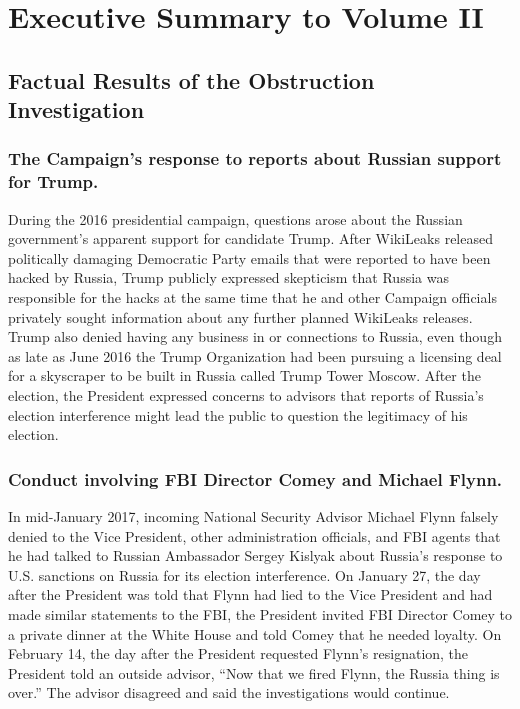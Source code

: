 \section*{Executive Summary to Volume II}
\label{sec:executive}

\subsection*{Factual Results of the Obstruction Investigation}

\subsubsection*{The Campaign’s response to reports about Russian support for Trump.}

During the 2016 presidential campaign, questions arose about the Russian government’s apparent support for candidate Trump.
After WikiLeaks released politically damaging Democratic Party emails that were reported to have been hacked by Russia, Trump publicly expressed skepticism that Russia was responsible for the hacks at the same time that he and other Campaign officials privately sought information about any further planned WikiLeaks releases.
Trump also denied having any business in or connections to Russia, even though as late as June 2016 the Trump Organization had been pursuing a licensing deal for a skyscraper to be built in Russia called Trump Tower Moscow.
After the election, the President expressed concerns to advisors that reports of Russia’s election interference might lead the public to question the legitimacy of his election.

\subsubsection*{Conduct involving FBI Director Comey and Michael Flynn.}

In mid-January 2017, incoming National Security Advisor Michael Flynn falsely denied to the Vice President, other administration officials, and FBI agents that he had talked to Russian Ambassador Sergey Kislyak about Russia’s response to U.S. sanctions on Russia for its election interference.
On January 27, the day after the President was told that Flynn had lied to the Vice President and had made similar statements to the FBI, the President invited FBI Director Comey to a private dinner at the White House and told Comey that he needed loyalty.
On February 14, the day after the President requested Flynn’s resignation, the President told an outside advisor, “Now that we fired Flynn, the Russia thing is over.”
The advisor disagreed and said the investigations would continue.

